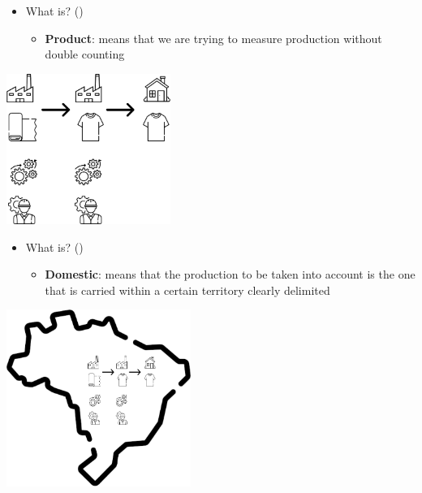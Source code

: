 \documentclass[
  ignorenonframetext,
]{beamer}
\providecommand{\tightlist}{%
  \setlength{\itemsep}{0pt}\setlength{\parskip}{0pt}}\usepackage{longtable,booktabs,array}
\begin{document}
\begin{frame}{}
\label{section-2}
\begin{itemize}
\item
  What is? ()

  \begin{itemize}
  \tightlist
  \item
    \textbf{Product}: means that we are trying to measure production
    without double counting
  \end{itemize}
\end{itemize}

\begin{center}
\includegraphics[width=0.4\textwidth,height=\textheight]{_000_images/001_image1.png}
\end{center}
\end{frame}

\begin{frame}{}
\label{section-3}
\begin{itemize}
\item
  What is? ()

  \begin{itemize}
  \tightlist
  \item
    \textbf{Domestic}: means that the production to be taken into
    account is the one that is carried within a certain territory
    clearly delimited
  \end{itemize}
\end{itemize}

\begin{center}
\includegraphics[width=0.45\textwidth,height=\textheight]{_000_images/001_image2.png}
\end{center}
\end{frame}
\end{document}
